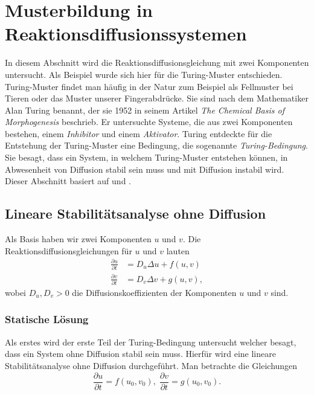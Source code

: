 %
%
%
%
\section{Musterbildung in Reaktionsdiffusionssystemen
\label{reaktdiff:section:teil1}}

In diesem Abschnitt wird die Reaktionsdiffusionsgleichung mit zwei Komponenten untersucht.
Als Beispiel wurde sich hier für die Turing-Muster entschieden.
%
Turing-Muster findet man häufig in der Natur zum Beispiel als Fellmuster bei Tieren oder  das Muster unserer Fingerabdrücke.
%
%
Sie sind nach dem Mathematiker Alan Turing benannt, der sie 1952 in seinem Artikel \textit{The Chemical Basis of Morphogenesis} \cite{turing1952chemical} beschrieb.
%
Er untersuchte Systeme, die aus zwei Komponenten bestehen, einem \emph{Inhibitor} und einem \emph{Aktivator}.
%
%
Turing entdeckte für die Entstehung der Turing-Muster eine Bedingung, die sogenannte \emph{Turing-Bedingung}.
%
Sie besagt, dass ein System, in welchem Turing-Muster entstehen können, in Abwesenheit von Diffusion stabil sein muss und mit Diffusion instabil wird.
Dieser Abschnitt basiert auf \cite{reaktdiff:turing_patterns_2019} und \cite{reaktdiff:hoyle2006pattern}.

\subsection{Lineare Stabilitätsanalyse ohne Diffusion
\label{reaktdiff:subsection:mathe}}
Als Basis haben wir zwei Komponenten \(u\) und \(v\).
Die Reaktionsdiffusionsgleichungen für \(u\) und \(v\) lauten
\begin{align*}
    \frac{\partial u}{\partial t} &= D_u \Delta u + f(u,v)\\
    \label{reaktdiff:equation:reaktdiff2}
    \frac{\partial v}{\partial t} &= D_v \Delta v + g(u,v),
\end{align*}
wobei \(D_u, D_v > 0\) die Diffusionskoeffizienten der Komponenten \(u\) und \(v\) sind.

\subsubsection{Statische Lösung}
Als erstes wird der erste Teil der Turing-Bedingung untersucht welcher besagt, dass ein System ohne Diffusion stabil sein muss.
Hierfür wird eine lineare Stabilitätsanalyse ohne Diffusion durchgeführt.
Man betrachte die Gleichungen
\begin{equation}
    \label{reaktdiff:equation:reaktdiff2ohneDiff}
    \frac{\partial u}{\partial t} = f(u_0,v_0),\;
    \frac{\partial v}{\partial t} = g(u_0,v_0).
\end{equation}

